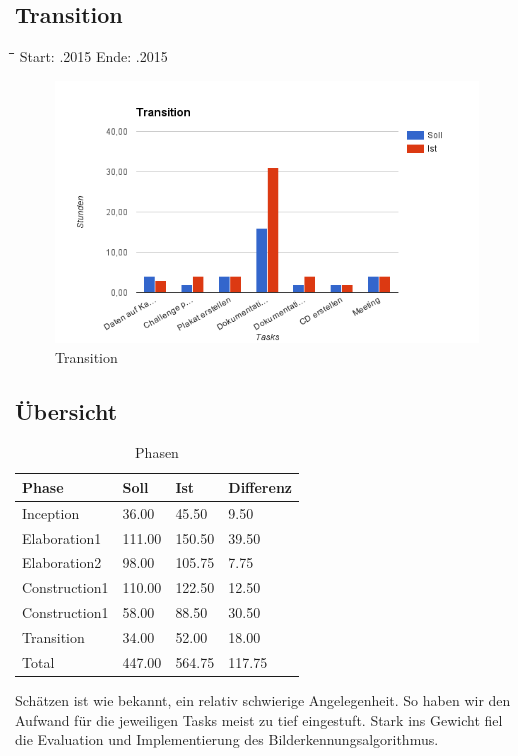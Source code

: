 \subsection{Transition}
\begin{tabbing}[H]
    \hspace*{3cm}\=\hspace*{5cm}\=\hspace*{3cm}\=\hspace*{3cm}\= \kill
    Start: .2015 \> Ende: .2015 \\
\end{tabbing}
\begin{figure}[H]
\centering
\includegraphics[width=390pt]{images/transition.png}
\caption[Transition]{Transition}
\end{figure}

\subsection{Übersicht}
\begin{table}[H]
\centering
    \begin{tabular}{|p{5cm}|p{2cm}|p{2cm}|p{2cm}|}
    \hline    
    \rowcolor{lightblue}
	Phase & Soll & Ist & Differenz \\ \hline
	Inception & 36.00 &	45.50 &	9.50 \\ \hline
	Elaboration1 & 111.00 & 150.50	& 39.50 \\ \hline
	Elaboration2 & 98.00 & 105.75 & 7.75 \\ \hline
	Construction1 & 110.00 & 122.50 & 12.50 \\ \hline
	Construction1 & 58.00 & 88.50 & 30.50 \\ \hline
	Transition & 34.00 & 52.00 & 18.00 \\ \hline
	\rowcolor{lightblue}
	Total & 447.00 & 564.75 & 117.75 \\ \hline
    \end{tabular}
    \caption[Phasen]{Phasen}
\end{table}
\medskip
Schätzen ist wie bekannt, ein relativ schwierige Angelegenheit. So haben wir den Aufwand für die jeweiligen Tasks meist zu tief eingestuft. Stark ins Gewicht fiel die Evaluation und Implementierung des Bilderkennungsalgorithmus.

\newpage